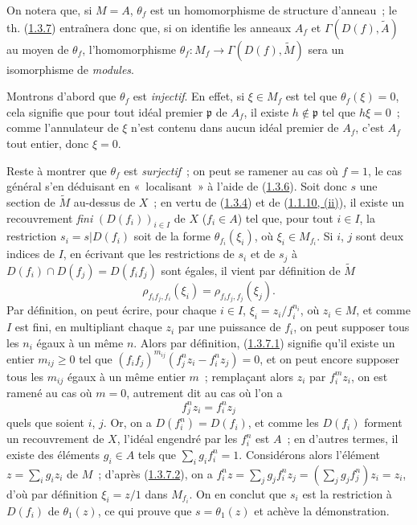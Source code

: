 On notera que, si $M=A$, $\theta_f$ est un homomorphisme de structure
d'anneau~; le th. (\hyperref[I.1.3.7-fr]{1.3.7}) entraînera donc que, si on
identifie les anneaux $A_f$ et $\Gamma(D(f),\widetilde{A})$ au moyen de
$\theta_f$, l'homomorphisme
$\theta_f:M_f\to\Gamma(D(f),\widetilde{M})$ sera un isomorphisme de
\emph{modules}.

Montrons d'abord que $\theta_f$ est \emph{injectif}. En effet, si
$\xi\in M_f$ est tel que $\theta_f(\xi)=0$, cela signifie que pour tout idéal
premier $\mathfrak{p}$ de $A_f$, il existe $h\notin\mathfrak{p}$ tel que
$h\xi=0$~; comme l'annulateur de $\xi$ n'est contenu dans aucun idéal premier
de $A_f$, c'est $A_f$ tout entier, donc $\xi=0$.

Reste à montrer que $\theta_f$ est \emph{surjectif}~; on peut se ramener au
cas où $f=1$, le cas général s'en déduisant en «~localisant~» à l'aide de
(\hyperref[I.1.3.6-fr]{1.3.6}). Soit donc $s$ une section de $\widetilde{M}$
au-dessus de $X$~; en vertu de (\hyperref[I.1.3.4-fr]{1.3.4}) et de
(\hyperref[I.1.1.10-fr]{1.1.10, (ii)}), il existe un recouvrement
\emph{fini} $(D(f_i))_{i\in I}$ de $X$ ($f_i\in A$) tel que, pour tout
$i\in I$, la restriction $s_i=s|D(f_i)$ soit de la forme
$\theta_{f_i}(\xi_i)$, où $\xi_i\in M_{f_i}$. Si $i$, $j$ sont deux indices
de $I$, en écrivant que les restrictions de $s_i$ et de $s_j$ à
$D(f_i)\cap D(f_j)=D(f_i f_j)$ sont égales, il vient par définition de
$\widetilde{M}$
\begin{equation}
  \rho_{f_i f_j,f_i}(\xi_i)=\rho_{f_i f_j,f_j}(\xi_j).
  \tag{1.3.7.1}\label{I.1.3.7.1-fr}
\end{equation}
Par définition, on peut écrire, pour chaque $i\in I$,
$\xi_i=z_i/f_i^{n_i}$, où $z_i\in M$, et comme $I$ est fini, en multipliant
chaque $z_i$ par une puissance de $f_i$, on peut supposer tous les $n_i$
égaux à un même $n$. Alors par définition, (\hyperref[I.1.3.7.1-fr]{1.3.7.1})
signifie qu'il existe un entier $m_{ij}\geq0$ tel que
$(f_i f_j)^{m_{ij}}(f_j^n z_i-f_i^n z_j)=0$, et on peut encore supposer tous
les $m_{ij}$ égaux à un même entier $m$~; remplaçant alors $z_i$ par
$f_i^m z_i$, on est ramené au cas où $m=0$, autrement dit au cas où l'on a
\begin{equation}
  f_j^n z_i=f_i^n z_j
  \tag{1.3.7.2}\label{I.1.3.7.2-fr}
\end{equation}
quels que soient $i$, $j$. Or, on a $D(f_i^n)=D(f_i)$, et comme les $D(f_i)$
forment un recouvrement de $X$, l'idéal engendré par les $f_i^n$ est $A$~;
en d'autres termes, il existe des éléments $g_i\in A$ tels que
$\sum_i g_i f_i^n=1$. Considérons alors l'élément
$z=\sum_i g_i z_i$ de $M$~; d'après (\hyperref[I.1.3.7.2-fr]{1.3.7.2}), on a
$f_i^n z=\sum_j g_j f_i^n z_j=(\sum_j g_j f_j^n)z_i=z_i$, d'où par
définition $\xi_i=z/1$ dans $M_{f_i}$. On en conclut
que $s_i$ est la restriction à $D(f_i)$ de $\theta_1(z)$, ce qui prouve que
$s=\theta_1(z)$ et achève la démonstration.

